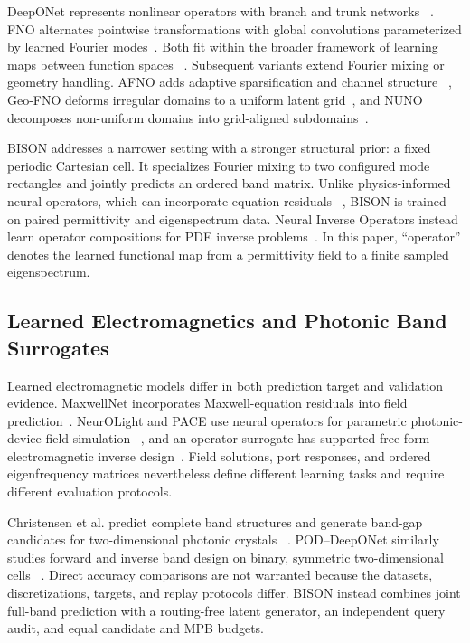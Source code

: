 DeepONet represents nonlinear operators with branch and trunk networks
~\cite{lu2021deeponet}. FNO alternates pointwise transformations with global
convolutions parameterized by learned Fourier modes~\cite{li2021fno}. Both fit
within the broader framework of learning maps between function spaces
~\cite{kovachki2023neuraloperator}. Subsequent variants extend Fourier mixing
or geometry handling. AFNO adds adaptive sparsification and channel structure
~\cite{guibas2022afno}, Geo-FNO deforms irregular domains to a uniform latent
grid~\cite{li2023geofno}, and NUNO decomposes non-uniform domains into
grid-aligned subdomains~\cite{liu2023nuno}.

BISON addresses a narrower setting with a stronger structural prior: a fixed
periodic Cartesian cell. It specializes Fourier mixing to two configured mode
rectangles and jointly predicts an ordered band matrix. Unlike
physics-informed neural operators, which can incorporate equation residuals
~\cite{li2021pino}, BISON is trained on paired permittivity and eigenspectrum
data. Neural Inverse Operators instead learn operator compositions for PDE
inverse problems~\cite{molinaro2023nio}. In this paper, ``operator'' denotes the
learned functional map from a permittivity field to a finite sampled
eigenspectrum.

\subsection{Learned Electromagnetics and Photonic Band Surrogates}

Learned electromagnetic models differ in both prediction target and validation
evidence. MaxwellNet incorporates Maxwell-equation residuals into field
prediction~\cite{lim2022maxwellnet}. NeurOLight and PACE use neural operators
for parametric photonic-device field simulation
~\cite{gu2022neurolight,zhu2024pace}, and an operator surrogate has supported
free-form electromagnetic inverse design~\cite{augenstein2023emno}. Field
solutions, port responses, and ordered eigenfrequency matrices nevertheless
define different learning tasks and require different evaluation protocols.

Christensen et al. predict complete band structures and generate band-gap
candidates for two-dimensional photonic crystals
~\cite{christensen2020predictive}. POD--DeepONet similarly studies forward and
inverse band design on binary, symmetric two-dimensional cells
~\cite{wang2026poddeeponet}. Direct accuracy comparisons are not warranted
because the datasets, discretizations, targets, and replay protocols differ.
BISON instead combines joint full-band prediction with a routing-free latent
generator, an independent query audit, and equal candidate and MPB budgets.

